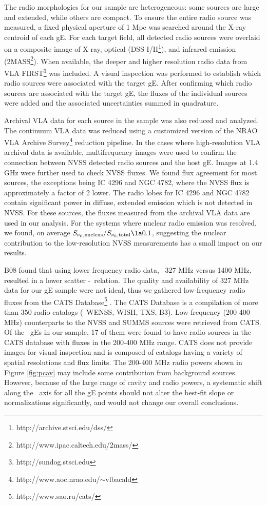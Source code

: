 \documentclass{emulateapj}
\begin{document}
The radio morphologies for our sample are heterogeneous: some sources
are large and extended, while others are compact. To ensure the entire
radio source was measured, a fixed physical aperture of 1 Mpc was
searched around the X-ray centroid of each gE. For each target field,
all detected radio sources were overlaid on a composite image of
X-ray, optical (DSS I/II\footnote{http://archive.stsci.edu/dss/}), and
infrared emission
(2MASS\footnote{http://www.ipac.caltech.edu/2mass/}). When available,
the deeper and higher resolution radio data from VLA
FIRST\footnote{http://sundog.stsci.edu} was included. A visual
inspection was performed to establish which radio sources were
associated with the target gE. After confirming which radio sources
are associated with the target gE, the fluxes of the individual
sources were added and the associated uncertainties summed in
quadrature.

Archival VLA data for each source in the sample was also reduced and
analyzed. The continuum VLA data was reduced using a customized
version of the NRAO VLA Archive
Survey\footnote{http://www.aoc.nrao.edu/$\sim$vlbacald} reduction
pipeline. In the cases where high-resolution VLA archival data is
available, multifrequency images were used to confirm the connection
between NVSS detected radio sources and the host gE. Images at 1.4 GHz
were further used to check NVSS fluxes. We found flux agreement for
most sources, the exceptions being IC 4296 and NGC 4782, where the
NVSS flux is approximately a factor of 2 lower. The radio lobes for IC
4296 and NGC 4782 contain significant power in diffuse, extended
emission which is not detected in NVSS. For these sources, the fluxes
measured from the archival VLA data are used in our analysis. For the
systems where nuclear radio emission was resolved, we found, on
average $S_{\nu_0,\mathrm{nucleus}} / S_{\nu_0,\mathrm{total}} \la
0.1$, suggesting the nuclear contribution to the low-resolution NVSS
measurements has a small impact on our results.

B08 found that using lower frequency radio data, \ie\ 327 MHz versus
1400 MHz, resulted in a lower scatter \pjet-\prad\ relation. The
quality and availability of 327 MHz data for our gE sample were not
ideal, thus we gathered low-frequency radio fluxes from the CATS
Database\footnote{http://www.sao.ru/cats/} \citep{cats}. The CATS
Database is a compilation of more than 350 radio catalogs (\eg\ WENSS,
WISH, TXS, B3). Low-frequency (200-400 MHz) counterparts to the NVSS
and SUMMS sources were retrieved from CATS. Of the \samp\ gEs in our
sample, 17 of them were found to have radio sources in the CATS
database with fluxes in the 200-400 MHz range. CATS does not provide
images for visual inspection and is composed of catalogs having a
variety of spatial resolutions and flux limits. The 200-400 MHz radio
powers shown in Figure \ref{fig:pcav} may include some contribution
from background sources. However, because of the large range of cavity
and radio powers, a systematic shift along the \prad\ axis for all the
gE points should not alter the best-fit slope or normalizations
significantly, and would not change our overall conclusions.
\end{document}
